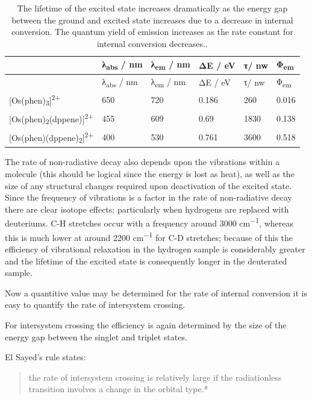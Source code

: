 \documentclass[
]{book}
\begin{document}
\begin{longtable}[]{@{}llllll@{}}
\caption{\label{tab:actinometer} The lifetime of the excited state increases dramatically as the energy gap between the ground and excited state increases due to a decrease in internal conversion. The quantum yield of emission increases as the rate constant for internal conversion decreases..}\tabularnewline
\toprule
& λ\textsubscript{abs} / nm & λ\textsubscript{em} / nm & ΔE / eV & τ/ nw & Φ\textsubscript{em} \\
\midrule
\endfirsthead
\toprule
& λ\textsubscript{abs} / nm & λ\textsubscript{em} / nm & ΔE / eV & τ/ nw & Φ\textsubscript{em} \\
\midrule
\endhead
{[}Os(phen)\textsubscript{3}{]}\textsuperscript{2+} & 650 & 720 & 0.186 & 260 & 0.016 \\
{[}Os(phen)\textsubscript{2}(dppene){]}\textsuperscript{2+} & 455 & 609 & 0.69 & 1830 & 0.138 \\
{[}Os(phen)(dppene)\textsubscript{2}{]}\textsuperscript{2+} & 400 & 530 & 0.761 & 3600 & 0.518 \\
\bottomrule
\end{longtable}

The rate of non-radiative decay also depends upon the vibrations within a molecule (this should be logical since the energy is lost as heat), as well as the size of any structural changes required upon deactivation of the excited state. Since the frequency of vibrations is a factor in the rate of non-radiative decay there are clear isotope effects; particularly when hydrogens are replaced with deuteriums. C-H stretches occur with a frequency around 3000 cm\textsuperscript{−1}, whereas this is much lower at around 2200 cm\textsuperscript{−1} for C-D stretches; because of this the efficiency of vibrational relaxation in the hydrogen sample is considerably greater and the lifetime of the excited state is consequently longer in the deuterated sample.

Now a quantitive value may be determined for the rate of internal conversion it is easy to quantify the rate of intersystem crossing.

For intersystem crossing the efficiency is again determined by the size of the energy gap between the singlet and triplet states.

El Sayed's rule states:

\begin{quote}
the rate of intersystem crossing is relatively large if the radiationless transition involves a change in the orbital type.*
\end{quote}
\end{document}
